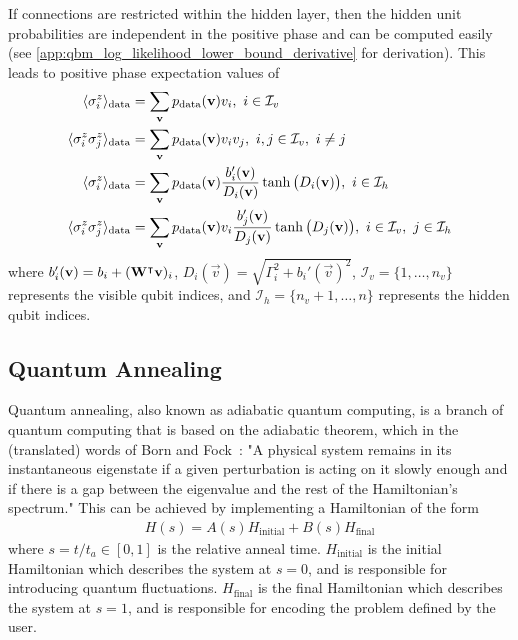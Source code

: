 If connections are restricted within the hidden layer, then the hidden unit probabilities are independent in the positive phase and can be computed easily (see \cref{app:qbm_log_likelihood_lower_bound_derivative} for derivation).
This leads to positive phase expectation values of
\begin{align}
\begin{split}
    \langle \sigma_i^z \rangle_\text{data}
        &= \sum_{\mathbf{v}} p_{\text{data}}(\mathbf{v}) v_i,
        \ i \in \mathcal{I}_v \\
    \langle \sigma_i^z \sigma_j^z \rangle_\text{data}
        &= \sum_{\mathbf{v}} p_{\text{data}}(\mathbf{v}) v_i v_j,
        \ i, j \in \mathcal{I}_v, \ i \ne j \\
    \langle \sigma_i^z \rangle_\text{data}
        &= \sum_{\mathbf{v}} p_{\text{data}}(\mathbf{v}) \frac{b_i'(\mathbf{v})}{D_i(\mathbf{v})} \tanh\big(D_i(\mathbf{v})\big),
        \ i \in \mathcal{I}_h \\
    \langle \sigma_i^z \sigma_j^z \rangle_\text{data}
        &= \sum_{\mathbf{v}} p_{\text{data}}(\mathbf{v}) v_i \frac{b_j'(\mathbf{v})}{D_j(\mathbf{v})} \tanh\big(D_j(\mathbf{v})\big),
        \ i \in \mathcal{I}_v, \ j \in \mathcal{I}_h
\end{split}
\end{align}
where \( b_i'(\mathbf{v}) = b_i + (\mathbf{W}^\intercal\mathbf{v})_i \), \( D_i(\vec{v}) = \sqrt{\Gamma_i^2 + b_i'(\vec{v})^2} \), \( \mathcal{I}_v = \{1, \dots, n_v\} \) represents the visible qubit indices, and \( \mathcal{I}_h = \{n_v + 1, \dots, n\} \) represents the hidden qubit indices.

\subsection{Quantum Annealing}
Quantum annealing, also known as adiabatic quantum computing, is a branch of quantum computing that is based on the adiabatic theorem, which in the (translated) words of Born and Fock~\cite{born_fock_1928}:
"A physical system remains in its instantaneous eigenstate if a given perturbation is acting on it slowly enough and if there is a gap between the eigenvalue and the rest of the Hamiltonian's spectrum."
This can be achieved by implementing a Hamiltonian of the form~\cite{qc_lecture_notes}
\begin{align}
    H(s) = A(s) H_{\text{initial}} + B(s) H_{\text{final}}
\end{align}
where \( s = t / t_a \in [0, 1] \) is the relative anneal time.
\( H_{\text{initial}} \) is the initial Hamiltonian which describes the system at \( s = 0 \), and is responsible for introducing quantum fluctuations.
\( H_{\text{final}} \) is the final Hamiltonian which describes the system at \( s = 1 \), and is responsible for encoding the problem defined by the user.

